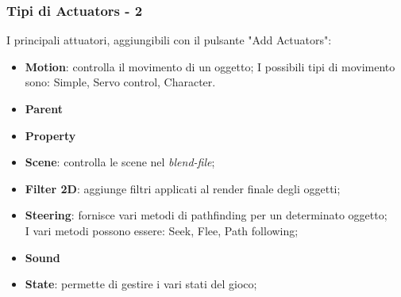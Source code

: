 \documentclass{beamer}
\begin{document}
				\begin{frame}
			\frametitle{Tipi di Actuators - 2}
			I principali attuatori, aggiungibili con il pulsante "Add Actuators":
			\begin{itemize}
				\item \textbf{Motion}: {\footnotesize controlla il movimento di un oggetto; I possibili tipi di movimento sono: Simple, Servo control, Character.}
				\item \textbf{Parent}
				\item \textbf{Property}
				\item \textbf{Scene}: {\footnotesize controlla le scene nel \textit{blend-file};}
				\item \textbf{Filter 2D}: {\footnotesize aggiunge filtri applicati al render finale degli oggetti;}
				\item \textbf{Steering}: {\footnotesize fornisce vari metodi di pathfinding per un determinato oggetto;\\I vari metodi possono essere: Seek, Flee, Path following;}
				\item \textbf{Sound}
				\item \textbf{State}: {\footnotesize permette di gestire i vari stati del gioco;}
			\end{itemize}
		\end{frame}
		
\end{document}
